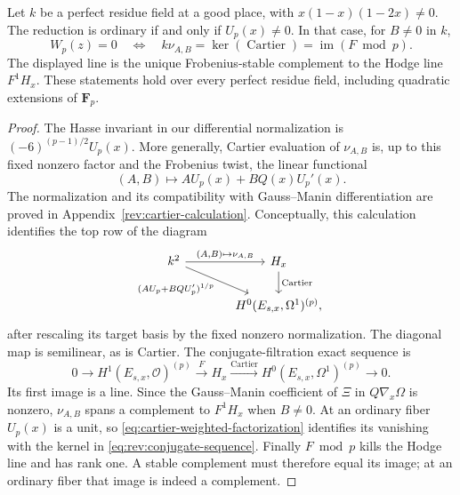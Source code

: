 \begin{lemma}
\label{lem:cartier-hypergeometric-bridge}
Let $k$ be a perfect residue field at a good place, with
$x(1-x)(1-2x)\ne0$.  The reduction is ordinary if and only if
$U_p(x)\ne0$.  In that case, for $B\ne0$ in $k$,
\begin{equation}\label{eq:rev:cartier-line}
 W_p(z)=0
 \quad\Longleftrightarrow\quad
 k\nu_{A,B}=\ker(\operatorname{Cartier})
             =\operatorname{im}(F\bmod p).
\end{equation}
The displayed line is the unique Frobenius-stable complement to the
Hodge line $F^1H_x$.  These statements hold over every perfect residue
field, including quadratic extensions of $\mathbf F_p$.
\end{lemma}
\begin{proof}
The Hasse invariant in our differential normalization is
$(-6)^{(p-1)/2}U_p(x)$.  More generally, Cartier evaluation of
$\nu_{A,B}$ is, up to this fixed nonzero factor and the Frobenius
twist, the linear functional
\[
             (A,B)\longmapsto AU_p(x)+BQ(x)U_p'(x).
\]
The normalization and its compatibility with Gauss--Manin differentiation
are proved in Appendix~\ref{rev:cartier-calculation}.  Conceptually,
this calculation identifies the top row of the diagram
\[
\begin{tikzcd}[column sep=large]
 k^2 \arrow[r,"{(A,B)\mapsto\nu_{A,B}}"]
       \arrow[dr,swap,"(AU_p+BQU_p')^{1/p}"]
   & H_x \arrow[d,"\operatorname{Cartier}"]\\
   & H^0(E_{s,x},\Omega^1)^{(p)},
\end{tikzcd}
\]
after rescaling its target basis by the fixed nonzero normalization.
The diagonal map is semilinear, as is Cartier.
The conjugate-filtration exact sequence is
\begin{equation}\label{eq:rev:conjugate-sequence}
 0\longrightarrow H^1(E_{s,x},\mathcal O)^{(p)}
 \xrightarrow{F}H_x
 \xrightarrow{\operatorname{Cartier}}
 H^0(E_{s,x},\Omega^1)^{(p)}\longrightarrow0.
\end{equation}
Its first image is a line.  Since the Gauss--Manin coefficient of
$\Xi$ in $Q\nabla_x\Omega$ is nonzero, $\nu_{A,B}$ spans a
complement to $F^1H_x$ when $B\ne0$.  At an ordinary fiber $U_p(x)$
is a unit, so \eqref{eq:cartier-weighted-factorization} identifies
its vanishing with the kernel in \eqref{eq:rev:conjugate-sequence}.
Finally $F\bmod p$ kills the Hodge line and has rank one.  A stable
complement must therefore equal its image; at an ordinary fiber that
image is indeed a complement.
\end{proof}

